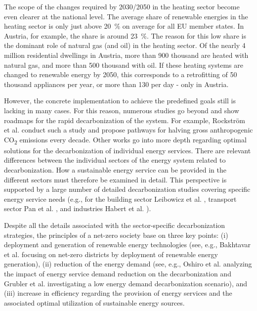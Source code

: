 The scope of the changes required by 2030/2050 in the heating sector become even clearer at the national level. The average share of renewable energies in the heating sector is only just above \SI{20}{\%} on average for all EU member states. In Austria, for example, the share is around \SI{23}{\%}. The reason for this low share is the dominant role of natural gas (and oil) in the heating sector. Of the nearly 4 million residential dwellings in Austria, more than 900 thousand are heated with natural gas, and more than 500 thousand with oil. If these heating systems are changed to renewable energy by 2050, this corresponds to a retrofitting of 50 thousand appliances per year, or more than 130 per day - only in Austria.\newline 

However, the concrete implementation to achieve the predefined goals still is lacking in many cases. For this reason, numerous studies go beyond and show roadmaps for the rapid decarbonization of the system. For example, Rockstr{\"o}m et al. \cite{rockstrom2017roadmap} conduct such a study and propose pathways for halving gross anthropogenic CO\textsubscript{2} emissions every decade. Other works go into more depth regarding optimal solutions for the decarbonization of individual energy services. There are relevant differences between the individual sectors of the energy system related to decarbonization. How a sustainable energy service can be provided in the different sectors must therefore be examined in detail. This perspective is supported by a large number of detailed decarbonization studies covering specific energy service needs (e.g., for the building sector Leibowicz et al. \cite{leibowicz2018optimal}, transport sector Pan et al. \cite{pan2018decarbonization}, and industries Habert et al. \cite{habert2020environmental}).\newline

Despite all the details associated with the sector-specific decarbonization strategies, the principles of a net-zero society base on three key points: (i) deployment and generation of renewable energy technologies (see, e.g., Bakhtavar et al. \cite{bakhtavar2020assessment} focusing on net-zero districts by deployment of renewable energy generation), (ii) reduction of the energy demand (see, e.g., Oshiro et al. \cite{oshiro2021enabling} analyzing the impact of energy service demand reduction on the decarbonization and Grubler et al. \cite{grubler2018low} investigating a low energy demand decarbonization scenario), and (iii) increase in efficiency regarding the provision of energy services and the associated optimal utilization of sustainable energy sources. 

